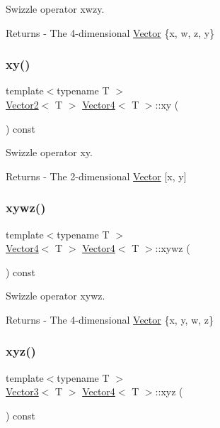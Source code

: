 Swizzle operator xwzy. \begin{DoxyReturn}{Returns}
-\/ The 4-\/dimensional \mbox{\hyperlink{class_vector}{Vector}} \{x, w, z, y\} 
\end{DoxyReturn}
\mbox{\label{class_vector4_aca433dfa3d0e963899d6a3916fda347a}} 
\subsubsection{\texorpdfstring{xy()}{xy()}}
{\footnotesize\ttfamily template$<$typename T $>$ \\
\mbox{\hyperlink{class_vector2}{Vector2}}$<$ T $>$ \mbox{\hyperlink{class_vector4}{Vector4}}$<$ T $>$\+::xy (\begin{DoxyParamCaption}{ }\end{DoxyParamCaption}) const}

Swizzle operator xy. \begin{DoxyReturn}{Returns}
-\/ The 2-\/dimensional \mbox{\hyperlink{class_vector}{Vector}} \mbox{[}x, y\mbox{]} 
\end{DoxyReturn}
\mbox{\label{class_vector4_ac919172fd134566a36b6ee1fb56ff2c3}} 
\subsubsection{\texorpdfstring{xywz()}{xywz()}}
{\footnotesize\ttfamily template$<$typename T $>$ \\
\mbox{\hyperlink{class_vector4}{Vector4}}$<$ T $>$ \mbox{\hyperlink{class_vector4}{Vector4}}$<$ T $>$\+::xywz (\begin{DoxyParamCaption}{ }\end{DoxyParamCaption}) const}

Swizzle operator xywz. \begin{DoxyReturn}{Returns}
-\/ The 4-\/dimensional \mbox{\hyperlink{class_vector}{Vector}} \{x, y, w, z\} 
\end{DoxyReturn}
\mbox{\label{class_vector4_a64bc2c65683c50be01c8646487d4d5b2}} 
\subsubsection{\texorpdfstring{xyz()}{xyz()}}
{\footnotesize\ttfamily template$<$typename T $>$ \\
\mbox{\hyperlink{class_vector3}{Vector3}}$<$ T $>$ \mbox{\hyperlink{class_vector4}{Vector4}}$<$ T $>$\+::xyz (\begin{DoxyParamCaption}{ }\end{DoxyParamCaption}) const}

